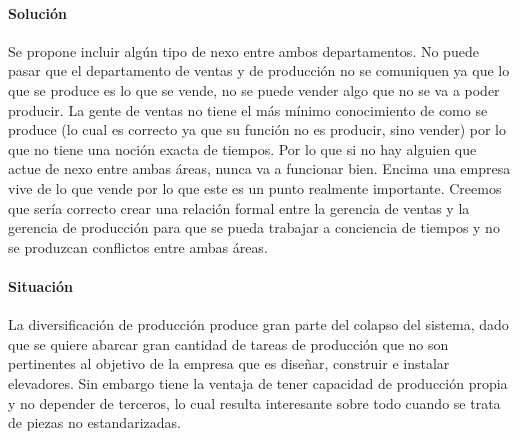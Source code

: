 \documentclass[12pt,a4paper,spanish]{article}
\begin{document}
\paragraph{Soluci\'on}
Se propone incluir alg\'un tipo de nexo entre ambos departamentos. No puede pasar que el departamento de ventas y de producci\'on no se comuniquen ya que lo que se produce es lo que se vende, no se puede vender algo que no se va a poder producir. La gente de ventas no tiene el m\'as m\'inimo conocimiento de como se produce (lo cual es correcto ya que su funci\'on no es producir, sino vender) por lo que no tiene una noci\'on exacta de tiempos. Por lo que si no hay alguien que actue de nexo entre ambas \'areas, nunca va a funcionar bien. Encima una empresa vive de lo que vende por lo que este es un punto realmente importante. Creemos que ser\'ia correcto crear una relaci\'on formal entre la gerencia de ventas y la gerencia de producci\'on para que se pueda trabajar a conciencia de tiempos y no se produzcan conflictos entre ambas \'areas.

\paragraph{Situaci\'on}
La diversificaci\'on de producci\'on produce gran parte del colapso del sistema, dado que se quiere abarcar gran cantidad de tareas de producci\'{o}n que no son pertinentes al objetivo de la empresa que es dise\~nar, construir e instalar elevadores. Sin embargo tiene la ventaja de tener capacidad de producci\'on propia y no depender de terceros, lo cual resulta interesante sobre todo cuando se trata de piezas no estandarizadas.
\end{document}

